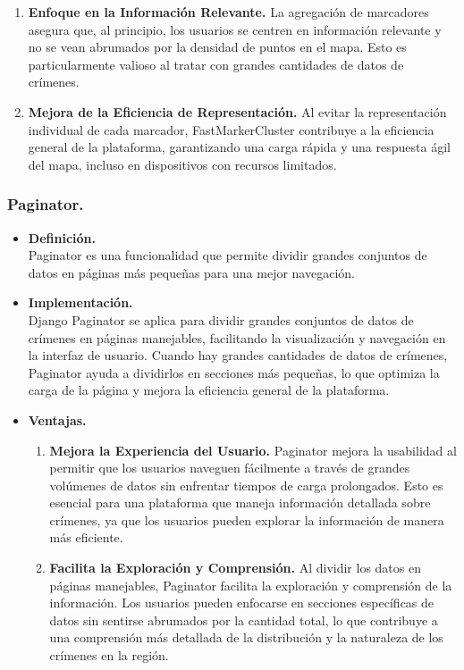 \documentclass{article}
\begin{document}
\begin{itemize}
\begin{enumerate}
                    \item \textbf{Enfoque en la Información Relevante.} La agregación de marcadores asegura que, al principio, los usuarios se centren en información relevante y no se vean abrumados por la densidad de puntos en el mapa. Esto es particularmente valioso al tratar con grandes cantidades de datos de crímenes.

                    \item \textbf{Mejora de la Eficiencia de Representación.} Al evitar la representación individual de cada marcador, FastMarkerCluster contribuye a la eficiencia general de la plataforma, garantizando una carga rápida y una respuesta ágil del mapa, incluso en dispositivos con recursos limitados.
                \end{enumerate}
            \end{itemize}
        \subsubsection{Paginator.}
            \begin{itemize}
                \item \textbf{Definición.}\\
                Paginator es una funcionalidad que permite dividir grandes conjuntos de datos en páginas más pequeñas para una mejor navegación.

                \item \textbf{Implementación.}\\
                Django Paginator se aplica para dividir grandes conjuntos de datos de crímenes en páginas manejables, facilitando la visualización y navegación en la interfaz de usuario. Cuando hay grandes cantidades de datos de crímenes, Paginator ayuda a dividirlos en secciones más pequeñas, lo que optimiza la carga de la página y mejora la eficiencia general de la plataforma.

                \item \textbf{Ventajas.}
                \begin{enumerate}
                    \item \textbf{Mejora la Experiencia del Usuario.} Paginator mejora la usabilidad al permitir que los usuarios naveguen fácilmente a través de grandes volúmenes de datos sin enfrentar tiempos de carga prolongados. Esto es esencial para una plataforma que maneja información detallada sobre crímenes, ya que los usuarios pueden explorar la información de manera más eficiente.

                    \item \textbf{Facilita la Exploración y Comprensión.} Al dividir los datos en páginas manejables, Paginator facilita la exploración y comprensión de la información. Los usuarios pueden enfocarse en secciones específicas de datos sin sentirse abrumados por la cantidad total, lo que contribuye a una comprensión más detallada de la distribución y la naturaleza de los crímenes en la región.
                \end{enumerate}
            \end{itemize}
\end{document}

